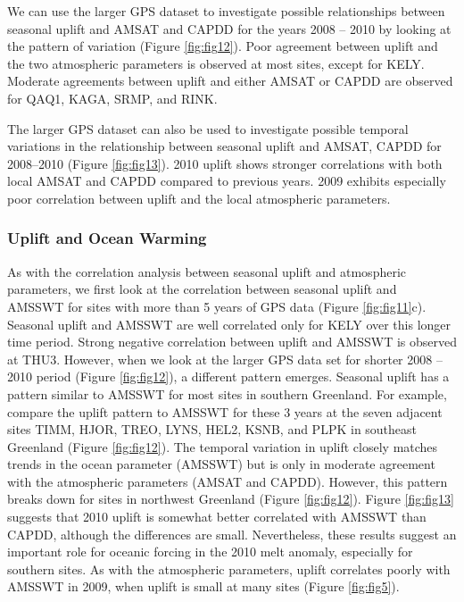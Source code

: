 We can use the larger GPS dataset to investigate
possible relationships between seasonal uplift and
AMSAT and CAPDD for the years 2008 – 2010
by looking at the pattern of variation (Figure \ref{fig:fig12}). Poor
agreement between uplift and the two atmospheric
parameters is observed at most sites, except for
KELY. Moderate agreements between uplift and
either AMSAT or CAPDD are observed for
QAQ1, KAGA, SRMP, and RINK.

The larger GPS dataset can also be used to
investigate possible temporal variations in the
relationship between seasonal uplift and AMSAT,
CAPDD for 2008–2010 (Figure \ref{fig:fig13}). 2010 uplift
shows stronger correlations with both local
AMSAT and CAPDD compared to previous years.
2009 exhibits especially poor correlation between
uplift and the local atmospheric parameters.


\subsubsection{Uplift and Ocean Warming}
As with the correlation analysis between seasonal
uplift and atmospheric parameters, we first look
at the correlation between seasonal uplift and
AMSSWT for sites with more than 5 years of
GPS data (Figure \ref{fig:fig11}c). Seasonal uplift and
AMSSWT are well correlated only for KELY over
this longer time period. Strong negative correlation
between uplift and AMSSWT is observed at THU3.
However, when we look at the larger GPS data
set for shorter 2008 – 2010 period (Figure \ref{fig:fig12}), a
different pattern emerges. Seasonal uplift has a
pattern similar to AMSSWT for most sites in
southern Greenland. For example, compare the
uplift pattern to AMSSWT for these 3 years at the
seven adjacent sites TIMM, HJOR, TREO, LYNS,
HEL2, KSNB, and PLPK in southeast Greenland
(Figure \ref{fig:fig12}). The temporal variation in uplift closely
matches trends in the ocean parameter (AMSSWT)
but is only in moderate agreement with the
atmospheric parameters (AMSAT and CAPDD).
However, this pattern breaks down for sites in
northwest Greenland (Figure \ref{fig:fig12}). Figure \ref{fig:fig13} suggests
that 2010 uplift is somewhat better correlated with
AMSSWT than CAPDD, although the differences
are small. Nevertheless, these results suggest an
important role for oceanic forcing in the 2010 melt
anomaly, especially for southern sites. As with the
atmospheric parameters, uplift correlates poorly
with AMSSWT in 2009, when uplift is small at
many sites (Figure \ref{fig:fig5}).

